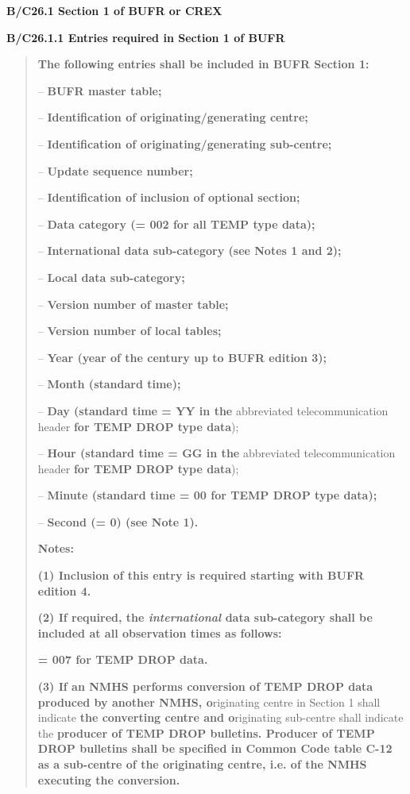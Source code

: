 \textbf{B/C26.1 Section 1 of BUFR or CREX}

\textbf{B/C26.1.1 Entries required in Section 1 of BUFR}

\begin{quote}
\textbf{The following entries shall be included in BUFR Section 1:}

-- \textbf{BUFR master table;}

-- \textbf{Identification of originating/generating centre;}

-- \textbf{Identification of originating/generating sub-centre;}

-- \textbf{Update sequence number;}

-- \textbf{Identification of inclusion of optional section;}

-- \textbf{Data category (= 002 for all TEMP type data);}

-- \textbf{International data sub-category (see Notes 1 and 2);}

-- \textbf{Local data sub-category;}

-- \textbf{Version number of master table;}

-- \textbf{Version number of local tables;}

-- \textbf{Year (year of the century up to BUFR edition 3);}

-- \textbf{Month (standard time);}

-- \textbf{Day (standard time = YY in the} abbreviated telecommunication header \textbf{for TEMP DROP type data});

-- \textbf{Hour (standard time = GG in the} abbreviated telecommunication header \textbf{for TEMP DROP type data});

-- \textbf{Minute (standard time = 00 for TEMP DROP type data);}

-- \textbf{Second (= 0) (see Note 1).}

\textbf{Notes:}

\textbf{(1) Inclusion of this entry is required starting with BUFR edition 4.}

\textbf{(2) If required, the \emph{international} data sub-category shall be included at all observation times as follows:}

\textbf{= 007 for TEMP DROP data.}

\textbf{(3) If an NMHS performs conversion of TEMP DROP data produced by another NMHS, o}riginating centre in Section 1 shall indicate \textbf{the converting centre and o}riginating sub-centre shall indicate the \textbf{producer of TEMP DROP bulletins. Producer of TEMP DROP bulletins shall be specified in Common Code table C-12 as a sub-centre of the originating centre, i.e. of the NMHS executing the conversion.}
\end{quote}


